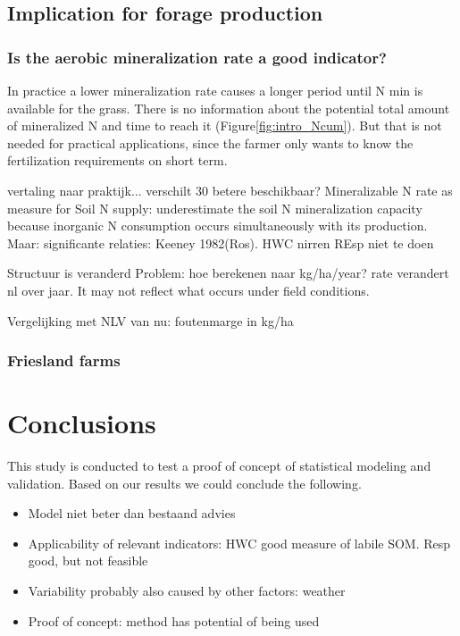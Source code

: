 \documentclass[10pt,twoside,dutch,english]{report}
\begin{document}
\section{Implication for forage production}
\subsection{Is the aerobic mineralization rate a good indicator?}
In practice a lower mineralization rate causes a longer period until N min is available for the grass.  There is no information about the potential total amount of mineralized N and time to reach it (Figure\ref{fig:intro_Ncum}). But that is not needed for practical applications, since the farmer only wants to know the fertilization requirements on short term. 

vertaling naar praktijk... verschilt 30%
betere beschikbaar?
    Mineralizable N rate as measure for Soil N supply: underestimate the soil N mineralization capacity because inorganic N consumption occurs simultaneously with its production. Maar: significante relaties: Keeney 1982(Ros). 
    HWC nirren
    REsp niet te doen
    
    Structuur is veranderd
    Problem: hoe berekenen naar kg/ha/year? rate verandert nl over jaar. It may not reflect what occurs under field conditions.


Vergelijking met NLV van nu: foutenmarge in kg/ha 


\subsection{Friesland farms}

   
  

\chapter{Conclusions }

This study is conducted to test a proof of concept of statistical modeling and validation. Based on our results we could conclude the following. 
\begin{itemize}
\item Model niet beter dan bestaand advies
\item Applicability of relevant indicators: HWC good measure of labile SOM. Resp good, but not feasible
\item Variability probably also caused by other factors: weather
\item Proof of concept: method has potential of being used
\end{itemize}
\end{document}
